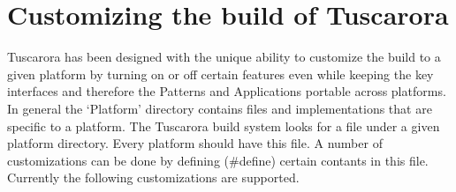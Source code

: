 
\section{Customizing the build of Tuscarora}
Tuscarora has been designed with the unique ability to customize the build to a given platform by turning on or off certain features even while keeping the key interfaces and therefore the Patterns and Applications portable across platforms. In general the `Platform' directory contains files and implementations that are specific to a platform. The Tuscarora build system looks for a  file under a given platform directory. Every platform should have this file. A number of customizations can be done by defining (\#define) certain contants in this file. Currently the following customizations are supported.

